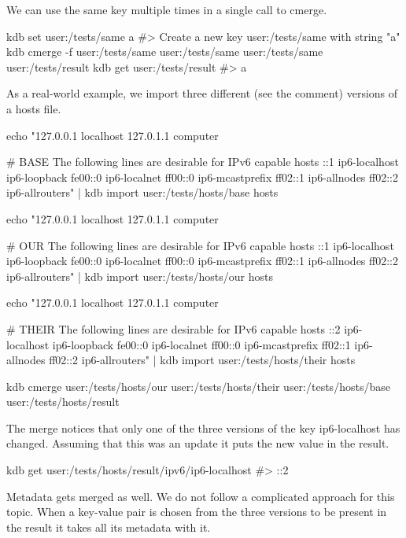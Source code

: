 We can use the same key multiple times in a single call to cmerge.


\begin{DoxyCode}
kdb set user:/tests/same a
#> Create a new key user:/tests/same with string "a"
kdb cmerge -f user:/tests/same user:/tests/same user:/tests/same user:/tests/result
kdb get user:/tests/result
#> a
\end{DoxyCode}


As a real-\/world example, we import three different (see the comment) versions of a hosts file.


\begin{DoxyCode}
echo "127.0.0.1       localhost
127.0.1.1       computer

# BASE The following lines are desirable for IPv6 capable hosts
::1     ip6-localhost ip6-loopback
fe00::0 ip6-localnet
ff00::0 ip6-mcastprefix
ff02::1 ip6-allnodes
ff02::2 ip6-allrouters" | kdb import user:/tests/hosts/base hosts

echo "127.0.0.1       localhost
127.0.1.1       computer

# OUR The following lines are desirable for IPv6 capable hosts
::1     ip6-localhost ip6-loopback
fe00::0 ip6-localnet
ff00::0 ip6-mcastprefix
ff02::1 ip6-allnodes
ff02::2 ip6-allrouters" | kdb import user:/tests/hosts/our hosts

echo "127.0.0.1       localhost
127.0.1.1       computer

# THEIR The following lines are desirable for IPv6 capable hosts
::2     ip6-localhost ip6-loopback
fe00::0 ip6-localnet
ff00::0 ip6-mcastprefix
ff02::1 ip6-allnodes
ff02::2 ip6-allrouters" | kdb import user:/tests/hosts/their hosts

kdb cmerge user:/tests/hosts/our user:/tests/hosts/their user:/tests/hosts/base user:/tests/hosts/result
\end{DoxyCode}


The merge notices that only one of the three versions of the key {\ttfamily ip6-\/localhost} has changed. Assuming that this was an update it puts the new value in the result.


\begin{DoxyCode}
kdb get user:/tests/hosts/result/ipv6/ip6-localhost
#> ::2
\end{DoxyCode}


Metadata gets merged as well. We do not follow a complicated approach for this topic. When a key-\/value pair is chosen from the three versions to be present in the result it takes all its metadata with it.

